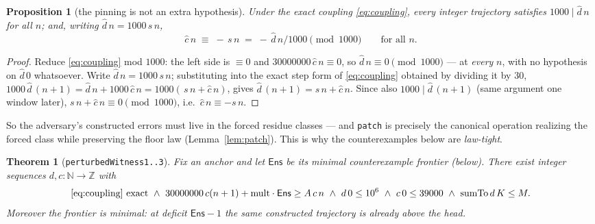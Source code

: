 \documentclass[11pt]{article}
\newcommand{\dhat}{\widehat{d}}
\newcommand{\chat}{\widehat{c}}
\newcommand{\sumto}{\operatorname{sumTo}}
\theoremstyle{plain}
\newtheorem{proposition}[lemma]{Proposition}
\newtheorem{theorem}[lemma]{Theorem}
\theoremstyle{definition}
\begin{document}
\begin{proposition}[the pinning is not an extra hypothesis]\label{prop:forced}
Under the \emph{exact} coupling \eqref{eq:coupling}, every integer trajectory satisfies
$1000\mid\dhat\,n$ for all $n$; and, writing $\dhat\,n=1000\,s\,n$,
\[
\chat\,n\;\equiv\;-\,s\,n\;=\;-\,\dhat\,n/1000\pmod{1000}\qquad\text{for all }n .
\]
\end{proposition}
\begin{proof}
Reduce \eqref{eq:coupling} mod $1000$: the left side is $\equiv 0$ and
$30000000\,\chat\,n\equiv 0$, so $\dhat\,n\equiv 0\pmod{1000}$ --- at \emph{every} $n$,
with no hypothesis on $\dhat\,0$ whatsoever. Write $\dhat\,n=1000\,s\,n$; substituting into the exact step form
of \eqref{eq:coupling} obtained by dividing it by $30$,
$1000\,\dhat\,(n+1)=\dhat\,n+1000\,\chat\,n=1000(\,s\,n+\chat\,n)$,
gives $\dhat\,(n+1)=s\,n+\chat\,n$. Since also $1000\mid\dhat\,(n+1)$ (same argument one window
later), $s\,n+\chat\,n\equiv 0\pmod{1000}$, i.e.\ $\chat\,n\equiv -s\,n$.
\end{proof}

So the adversary's constructed errors must live in the forced residue classes --- and
\texttt{patch} is precisely the canonical operation realizing the forced class while
preserving the floor law (Lemma~\ref{lem:patch}). This is why the counterexamples below
are \emph{law-tight}.

\begin{theorem}[\texttt{perturbedWitness1..3}]\label{thm:perturbed}
Fix an anchor and let $\mathsf{Ens}$ be its minimal counterexample frontier (below).
There \emph{exist} integer sequences $d,c:\mathbb{N}\to\mathbb{Z}$ with
\[
\text{\eqref{eq:coupling} exact}\ \wedge\
30000000\,c(n+1)+\mathrm{mult}\cdot\mathsf{Ens}\ge A\,c\,n\
\wedge\ d\,0\le 10^{6}\ \wedge\ c\,0\le 39000\ \wedge\ \sumto d\,K\le M .
\]
Moreover the frontier is minimal: at deficit $\mathsf{Ens}-1$ the same constructed
trajectory is already \emph{above} the head.
\end{theorem}
\end{document}

